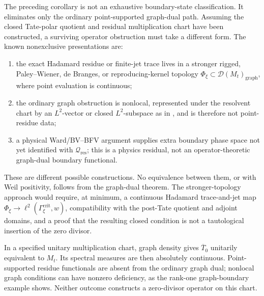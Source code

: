 \begin{remark}
\label{v4-arith:w9-r4:rem:beta-had-surviving-branches}
The preceding corollary is not an exhaustive boundary-state
classification. It eliminates only the ordinary point-supported graph-dual path. Assuming
the closed Tate-polar quotient and residual multiplication chart have been
constructed, a surviving operator obstruction must take a different form.
The known nonexclusive presentations are:
\begin{enumerate}
\item the exact Hadamard residue or finite-jet trace lives in a stronger
rigged, Paley--Wiener, de Branges, or reproducing-kernel topology
\(\Phi_{\xi}\subset\mathcal{D}(M_t)_{\mathrm{graph}}\), where point
evaluation is continuous;
\item the ordinary graph obstruction is nonlocal, represented under the
resolvent chart by an \(L^2\)-vector or closed \(L^2\)-subspace as in
, and is therefore
not point-residue data;
\item a physical Ward/BV--BFV argument supplies extra boundary phase
space not yet identified with
\(\mathcal{Q}_{\mathrm{res}}\); this is a physics residual, not an
operator-theoretic graph-dual boundary functional.
\end{enumerate}
These are different possible constructions. No equivalence between
them, or with Weil positivity, follows from the graph-dual theorem. The
stronger-topology approach would require, at minimum, a continuous
Hadamard trace-and-jet map
\(\Phi_{\xi}\to\ell^{2}(\Gamma_{\xi}^{\mathrm{crit}},w)\), compatibility
with the post-Tate quotient and adjoint domains, and a proof that the
resulting closed condition is not a tautological insertion of the zero
divisor.
\end{remark}

\begin{remark}
\label{v4-arith:w9-r4:rem:deficiency-calculation-answer}
In a specified unitary multiplication chart, graph density gives
\(\overline T_0\) unitarily equivalent to \(M_t\).
Its spectral measures are then absolutely continuous.
Point-supported residue functionals are absent from the ordinary
graph dual; nonlocal graph conditions can have nonzero deficiency,
as the rank-one graph-boundary example shows. Neither outcome
constructs a zero-divisor operator on this chart.
\end{remark}

